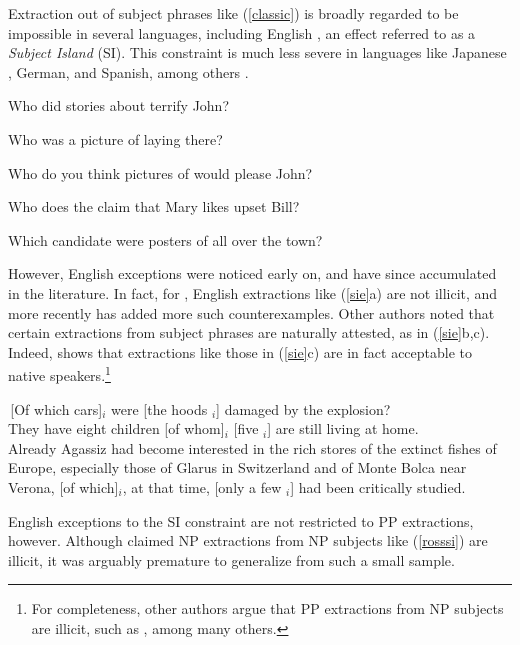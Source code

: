 \documentclass[output=paper]{langsci/langscibook}
\begin{document}
Extraction out of subject phrases like (\ref{classic}) 
is broadly regarded to be impossible in several languages, including
English \cite{Ross67,chomsky73}, an effect referred to as a {\it Subject Island} (SI).
This constraint is  much less severe  in languages like Japanese , German, and Spanish,
among others \citep{stepanov,jurkaetal,goodall11,greco,fukuda,polinsky13}. 


\ea \label{all}
\ea  *Who did stories about terrify John?\\
 \citep[106]{chomsky77b}

\ex  *Who was a picture of laying there?\\
\citep[114]{kayne81} 

\ex *Who do you think pictures of would please John?\\
\citep[497]{huang82}

\ex *Who does the claim that Mary likes upset Bill?\\
\citep[42]{lasniksaito}

\ex *Which candidate were posters of  all over the town?\\
\citep{lasnikpark}
\z \label{classic}
\z


\noindent
However, English exceptions were noticed early on, and have since accumulated in the literature.
In fact,  for \citet{Ross67},  English extractions like (\ref{sie}a) are not illicit,
and more recently \citet[147]{chomsky08} has added more such counterexamples.
Other authors noted that certain extractions from subject phrases are naturally attested, as in (\ref{sie}b,c). Indeed,  \citet{annerels} shows that extractions like those in (\ref{sie}c) are in fact acceptable to native speakers.\footnote{For completeness, other authors argue that PP extractions from
 NP subjects are illicit, such as \citet[653]{lasnikpark}, among many others.}


\ea
\ea \,[Of which cars]$_i$ were [the hoods \spc$_i$] damaged by the explosion?\\
\citep[4.252]{Ross67} 
\ex They have eight children [of whom]$_i$ [five \spc$_i$] are still living at home.\\
\citep[1093]{hud12} 
\ex Already Agassiz had become interested in the rich stores of the extinct fishes of Europe, especially those of Glarus in Switzerland and of Monte Bolca near Verona, [of which]$_i$, at that time, [only a few \spc$_i$] had been critically studied.\\
\citep{santorini}
\z \label{sie}
\z

\noindent
English exceptions to the SI constraint are not restricted to PP extractions, however. Although
\citet{Ross67} claimed NP extractions from NP subjects like (\ref{rosssi}) are illicit,
it was arguably premature to generalize from such a small sample.
\end{document}
